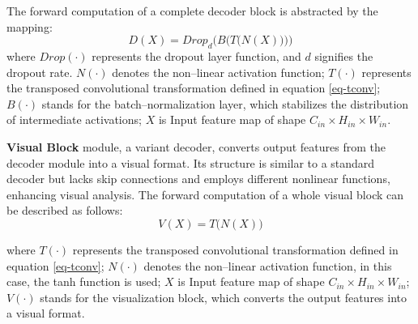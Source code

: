 \documentclass[a4paper, times, 10pt,twocolumn]{article}
\begin{document}
The forward computation of a complete decoder block is abstracted by the mapping:
\begin{equation}
	\label{eq-decoder}
	D(X) = Drop_{d}\bigl( B \bigl( T \bigl( N(X) \bigr) \bigr) \bigr)
\end{equation}
where 
$Drop(\cdot)$ represents the dropout layer function, and $d$ signifies the dropout rate.
$N(\cdot)$ denotes the non--linear activation function;
$T(\cdot)$ represents the transposed convolutional transformation defined in equation \eqref{eq-tconv};
$B(\cdot)$ stands for the batch--normalization layer, which stabilizes the distribution of intermediate activations;
$X$ is Input feature map of shape $C_{in} \times H_{in} \times W_{in}$.

\textbf{Visual Block} module, a variant decoder, converts output features from the decoder module into a visual format. Its structure is similar to a standard decoder but lacks skip connections and employs different nonlinear functions, enhancing visual analysis. The forward computation of a whole visual block can be described as follows:
\begin{equation}
	\label{eq-visual}
	V(X) =  T \bigl( N(X) \bigr)
\end{equation}

where
$T(\cdot)$ represents the transposed convolutional transformation defined in equation \eqref{eq-tconv};
$N(\cdot)$ denotes the non--linear activation function, in this case, the tanh function is used;
$X$ is Input feature map of shape $C_{in} \times H_{in} \times W_{in}$;
$V(\cdot)$ stands for the visualization block, which converts the output features into a visual format.
\end{document}
